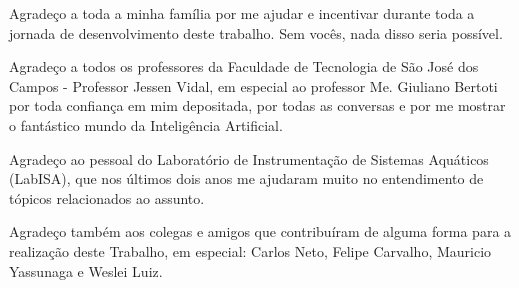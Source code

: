 \begin{agradecimentos}

\par Agradeço a toda a minha família por me ajudar e incentivar durante toda a jornada de desenvolvimento deste trabalho. Sem vocês, nada disso seria possível.
\par Agradeço a todos os professores da Faculdade de Tecnologia de São José dos Campos - Professor Jessen Vidal, em especial ao professor Me. Giuliano Bertoti por toda confiança em mim depositada, por todas as conversas e por me mostrar o fantástico mundo da Inteligência Artificial.
\par Agradeço ao pessoal do Laboratório de Instrumentação de Sistemas Aquáticos (LabISA), que nos últimos dois anos me ajudaram muito no entendimento de tópicos relacionados ao assunto.
\par Agradeço também aos colegas e amigos que contribuíram de alguma forma para a realização deste Trabalho, em especial: Carlos Neto, Felipe Carvalho, Mauricio Yassunaga e Weslei Luiz.

\end{agradecimentos}
